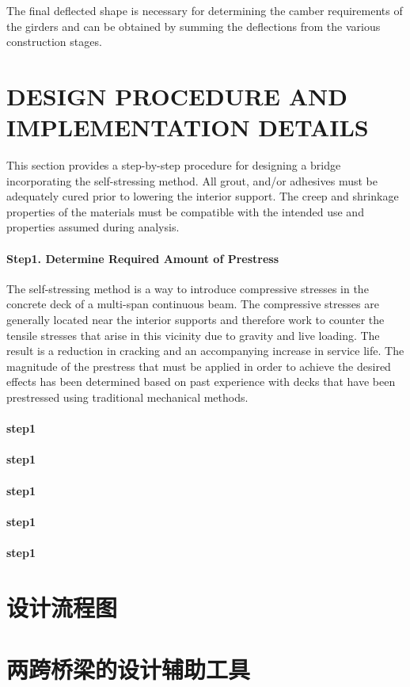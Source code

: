 The final deflected shape is necessary for determining the camber requirements of the girders and can be obtained by summing the deflections from the various construction stages.

\section{DESIGN PROCEDURE AND IMPLEMENTATION DETAILS}

This section provides a step-by-step procedure for designing a bridge incorporating the self-stressing method. All grout, and/or adhesives must be adequately cured prior to lowering the interior support. The creep and shrinkage properties of the materials must be compatible with the intended use and properties assumed during analysis.

\paragraph*{Step1. Determine Required Amount of Prestress}
The self-stressing method is a way to introduce compressive stresses in the concrete deck of a multi-span
continuous beam. The compressive stresses are generally located near the interior supports and therefore work to
counter the tensile stresses that arise in this vicinity due to gravity and live loading. The result is a reduction in
cracking and an accompanying increase in service life. The magnitude of the prestress that must be applied in order
to achieve the desired effects has been determined based on past experience with decks that have been prestressed
using traditional mechanical methods.


\paragraph*{step1}
\paragraph*{step1}
\paragraph*{step1}
\paragraph*{step1}
\paragraph*{step1}


\section{设计流程图}

\section{两跨桥梁的设计辅助工具}